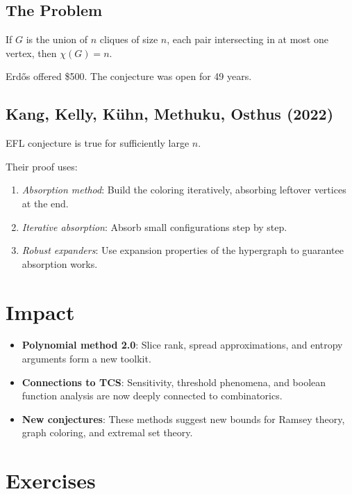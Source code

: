 \subsection{The Problem}
\begin{conjecture}
If $G$ is the union of $n$ cliques of size $n$, each pair intersecting in at most one vertex, then $\chi(G) = n$.
\end{conjecture}

Erdős offered \$500. The conjecture was open for 49 years.

\subsection{Kang, Kelly, Kühn, Methuku, Osthus (2022)}

\begin{theorem}
EFL conjecture is true for sufficiently large $n$.
\end{theorem}

Their proof uses:
\begin{enumerate}
\item \emph{Absorption method}: Build the coloring iteratively, absorbing leftover vertices at the end.
\item \emph{Iterative absorption}: Absorb small configurations step by step.
\item \emph{Robust expanders}: Use expansion properties of the hypergraph to guarantee absorption works.
\end{enumerate}

\section{Impact}
\begin{itemize}
\item \textbf{Polynomial method 2.0}: Slice rank, spread approximations, and entropy arguments form a new toolkit.
\item \textbf{Connections to TCS}: Sensitivity, threshold phenomena, and boolean function analysis are now deeply connected to combinatorics.
\item \textbf{New conjectures}: These methods suggest new bounds for Ramsey theory, graph coloring, and extremal set theory.
\end{itemize}

\section{Exercises}

